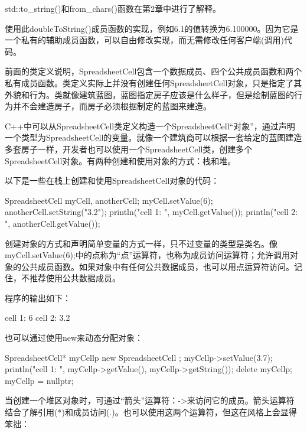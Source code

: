 std::to\_string()和from\_chars()函数在第2章中进行了解释。

使用此doubleToString()成员函数的实现，例如6.1的值转换为6.100000。因为它是一个私有的辅助成员函数，可以自由修改实现，而无需修改任何客户端(调用)代码。


前面的类定义说明，SpreadsheetCell包含一个数据成员、四个公共成员函数和两个私有成员函数。类定义实际上并没有创建任何SpreadsheetCell对象，只是指定了其外貌和行为。类就像建筑蓝图，蓝图指定房子应该是什么样子，但是绘制蓝图的行为并不会建造房子，而房子必须根据制定的蓝图来建造。

C++中可以从SpreadsheetCell类定义构造一个SpreadsheetCell“对象”，通过声明一个类型为SpreadsheetCell的变量。就像一个建筑商可以根据一套给定的蓝图建造多套房子一样，开发者也可以使用一个SpreadsheetCell类，创建多个SpreadsheetCell对象。有两种创建和使用对象的方式：栈和堆。


以下是一些在栈上创建和使用SpreadsheetCell对象的代码：

\begin{cpp}
SpreadsheetCell myCell, anotherCell;
myCell.setValue(6);
anotherCell.setString("3.2");
println("cell 1: {}", myCell.getValue());
println("cell 2: {}", anotherCell.getValue());
\end{cpp}

创建对象的方式和声明简单变量的方式一样，只不过变量的类型是类名。像myCell.setValue(6);中的点称为“点”运算符，也称为成员访问运算符；允许调用对象的公共成员函数。如果对象中有任何公共数据成员，也可以用点运算符访问。记住，不推荐使用公共数据成员。

程序的输出如下：

\begin{shell}
cell 1: 6
cell 2: 3.2
\end{shell}


也可以通过使用new来动态分配对象：

\begin{cpp}
SpreadsheetCell* myCellp { new SpreadsheetCell { } };
myCellp->setValue(3.7);
println("cell 1: {} {}", myCellp->getValue(), myCellp->getString());
delete myCellp;
myCellp = nullptr;
\end{cpp}

当创建一个堆区对象时，可通过“箭头”运算符：->来访问它的成员。箭头运算符结合了解引用(*)和成员访问(.)。也可以使用这两个运算符，但这在风格上会显得笨拙：

